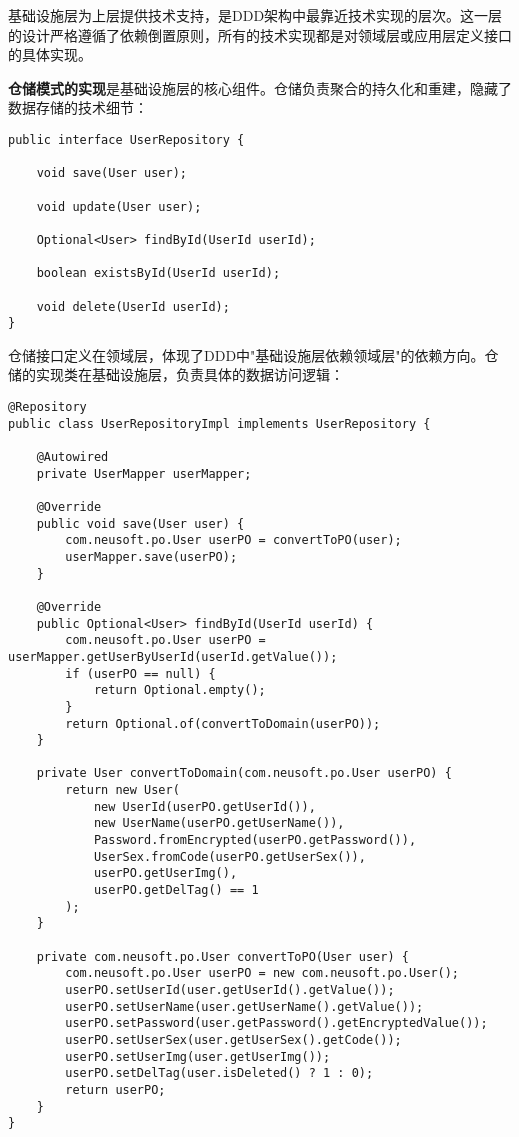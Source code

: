 \documentclass[a4paper,12pt]{article}
\begin{document}
基础设施层为上层提供技术支持，是DDD架构中最靠近技术实现的层次。这一层的设计严格遵循了依赖倒置原则，所有的技术实现都是对领域层或应用层定义接口的具体实现。

\textbf{仓储模式的实现}是基础设施层的核心组件。仓储负责聚合的持久化和重建，隐藏了数据存储的技术细节：

\begin{lstlisting}[caption=用户仓储接口定义]
public interface UserRepository {
    
    void save(User user);
    
    void update(User user);
    
    Optional<User> findById(UserId userId);
    
    boolean existsById(UserId userId);
    
    void delete(UserId userId);
}
\end{lstlisting}

仓储接口定义在领域层，体现了DDD中"基础设施层依赖领域层"的依赖方向。仓储的实现类在基础设施层，负责具体的数据访问逻辑：

\begin{lstlisting}[caption=用户仓储实现类]
@Repository
public class UserRepositoryImpl implements UserRepository {
    
    @Autowired
    private UserMapper userMapper;
    
    @Override
    public void save(User user) {
        com.neusoft.po.User userPO = convertToPO(user);
        userMapper.save(userPO);
    }
    
    @Override
    public Optional<User> findById(UserId userId) {
        com.neusoft.po.User userPO = userMapper.getUserByUserId(userId.getValue());
        if (userPO == null) {
            return Optional.empty();
        }
        return Optional.of(convertToDomain(userPO));
    }
    
    private User convertToDomain(com.neusoft.po.User userPO) {
        return new User(
            new UserId(userPO.getUserId()),
            new UserName(userPO.getUserName()),
            Password.fromEncrypted(userPO.getPassword()),
            UserSex.fromCode(userPO.getUserSex()),
            userPO.getUserImg(),
            userPO.getDelTag() == 1
        );
    }
    
    private com.neusoft.po.User convertToPO(User user) {
        com.neusoft.po.User userPO = new com.neusoft.po.User();
        userPO.setUserId(user.getUserId().getValue());
        userPO.setUserName(user.getUserName().getValue());
        userPO.setPassword(user.getPassword().getEncryptedValue());
        userPO.setUserSex(user.getUserSex().getCode());
        userPO.setUserImg(user.getUserImg());
        userPO.setDelTag(user.isDeleted() ? 1 : 0);
        return userPO;
    }
}
\end{lstlisting}
\end{document}
